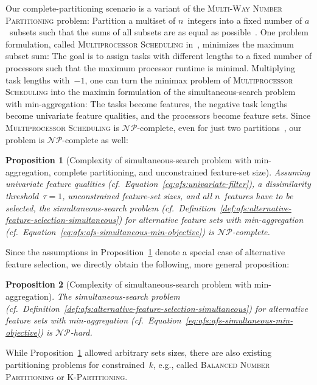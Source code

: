 \documentclass{article}
\newtheorem{proposition}{Proposition}
\theoremstyle{definition}
\begin{document}
Our complete-partitioning scenario is a variant of the \textsc{Multi-Way Number Partitioning} problem:
Partition a multiset of $n$~integers into a fixed number of $a$~subsets such that the sums of all subsets are as equal as possible~\cite{korf2010objective}.
One problem formulation, called \textsc{Multiprocessor Scheduling} in~\cite{garey2003computers}, minimizes the maximum subset sum:
The goal is to assign tasks with different lengths to a fixed number of processors such that the maximum processor runtime is minimal.
Multiplying task lengths with~$-1$, one can turn the minimax problem of \textsc{Multiprocessor Scheduling} into the maximin formulation of the simultaneous-search problem with min-aggregation:
The tasks become features, the negative task lengths become univariate feature qualities, and the processors become feature sets. 
Since \textsc{Multiprocessor Scheduling} is $\mathcal{NP}$-complete, even for just two partitions~\cite{garey2003computers}, our problem is $\mathcal{NP}$-complete as well:
%
\begin{proposition}[Complexity of simultaneous-search problem with min-aggregation, complete partitioning, and unconstrained feature-set size]
	Assuming univariate feature qualities (cf.~Equation~\ref{eq:afs:univariate-filter}), a dissimilarity threshold~$\tau = 1$, unconstrained feature-set sizes, and all $n$~features have to be selected, the simultaneous-search problem (cf.~Definition~\ref{def:afs:alternative-feature-selection-simultaneous}) for alternative feature sets with min-aggregation (cf.~Equation~\ref{eq:afs:afs-simultaneous-min-objective}) is $\mathcal{NP}$-complete.
	\label{prop:afs:complexity-partitioning-min-unconstrained-k}
\end{proposition}
%
Since the assumptions in Proposition~\ref{prop:afs:complexity-partitioning-min-unconstrained-k} denote a special case of alternative feature selection, we directly obtain the following, more general proposition:
%
\begin{proposition}[Complexity of simultaneous-search problem with min-aggregation]
	The simultaneous-search problem (cf.~Definition~\ref{def:afs:alternative-feature-selection-simultaneous}) for alternative feature sets with min-aggregation (cf.~Equation~\ref{eq:afs:afs-simultaneous-min-objective}) is $\mathcal{NP}$-hard.
	\label{prop:afs:complexity-simultaneous-np}
\end{proposition}
%
While Proposition~\ref{prop:afs:complexity-partitioning-min-unconstrained-k} allowed arbitrary sets sizes, there are also existing partitioning problems for constrained~$k$, e.g., called \textsc{Balanced Number Partitioning} or \textsc{K-Partitioning}.
\end{document}
